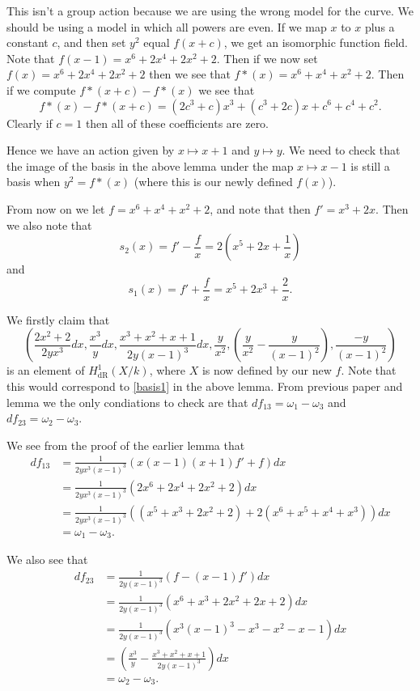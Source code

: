 \documentclass[draft, 11pt]{article} %
\theoremstyle{plain}
\theoremstyle{remark}
\newcommand{\derhamhone}{H_{\text {dR}}^1(X/k)}
\begin{document}
This isn't a group action because we are using the wrong model for the curve.
We should be using a model in which all powers are even.
If we map $x$ to $x$ plus a constant $c$, and then set $y^2$ equal $f(x+c)$, we get an isomorphic function field.
Note that $f(x-1) = x^6 + 2x^4 + 2x^2 + 2$.
Then if we now set $f(x) = x^6 + 2x^4 + 2x^2 + 2$ then we see that $f*(x) = x^6 + x^4 + x^2 + 2$.
Then if we compute $f*(x+c) - f*(x)$ we see that
\[
f*(x) - f*(x+c) = (2c^3+c)x^3 + (c^3+2c)x + c^6 + c^4 + c^2.
\]
Clearly if $c=1$ then all of these coefficients are zero.

Hence we have an action given by $x \mapsto x+1$ and $y \mapsto y$.
We need to check that the image of the basis in the above lemma under the map $x  \mapsto x-1$ is still a basis when $y^2 = f*(x)$ (where this is our newly defined $f(x)$).


From now on we let $f= x^6 + x^4 + x^2 + 2$, and note that then $f' = x^3 + 2x$.
Then we also note that
\[
s_2(x) = f'-\frac{f}{x} = 2\left(x^5 + 2x+ \frac{1}{x}\right)
\]
and
\[
s_1(x) = f' + \frac{f}{x} = x^5 + 2x^3 + \frac{2}{x}.
\]

We firstly claim that
\[
\left( \frac{2x^2 + 2}{2yx^3}dx, \frac{x^3}{y}dx, \frac{x^3 + x^2 + x + 1}{2y(x-1)^3}dx, \frac{y}{x^2}, \left( \frac{y}{x^2} - \frac{y}{(x-1)^2}\right), \frac{-y}{(x-1)^2}\right)
\]
is an element of $\derhamhone$, where $X$ is now defined by our new $f$.
Note that this would correspond to \eqref{basis1} in the above lemma.
From previous paper and lemma we the only condiations to check are that $df_{13} = \omega_1 - \omega_3$ and $df_{23} = \omega_2 - \omega_3$.

We see from the proof of the earlier lemma that
\begin{align}
df_{13} & = \frac{1}{2yx^3(x-1)^3} (x(x-1)(x+1)f' + f)dx \\
& = \frac{1}{2yx^3(x-1)^3}(2x^6 + 2x^4 + 2x^2 + 2)dx \\
& = \frac{1}{2yx^3(x-1)^3}((x^5 + x^3 + 2x^2 + 2) + 2(x^6 + x^5 + x^4 + x^3))dx \\
& = \omega_1 - \omega_3.
\end{align}

We also see that
\begin{align}
df_{23} & = \frac{1}{2y(x-1)^3}(f-(x-1)f')dx \\
& = \frac{1}{2y(x-1)^3}(x^6 + x^3 + 2x^2 + 2x+ 2)dx \\
& = \frac{1}{2y(x-1)^3}(x^3(x-1)^3 - x^3 - x^2 - x - 1) dx \\
& = \left(\frac{x^3}{y} - \frac{x^3 + x^2 + x+1}{2y(x-1)^3}\right) dx \\
& = \omega_2 - \omega_3.
\end{align}
\end{document}
